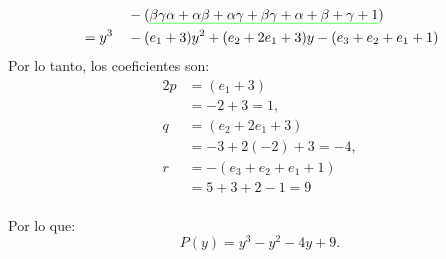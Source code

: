 \begin{solucion}
\begin{alignat*}{2}
    & &&-(\text{\setulcolor{green}\ul{$\beta\gamma\alpha + \alpha\beta + \alpha\gamma + \beta\gamma  + \alpha + \beta + \gamma + 1$}})\\
    &= y^3 && - (e_1 + 3)y^2 + (e_2 + 2e_1 + 3)y - (e_3 + e_2 + e_1 + 1)\\
  \end{alignat*}
  Por lo tanto, los coeficientes son:
  \begin{align*}{2}
    p &= (e_1 + 3)\\
    &= -2 + 3 = 1,\\
    q &= (e_2 + 2e_1 + 3) \\
    &= -3 + 2(-2) + 3 = -4,\\
    r &= -(e_3 + e_2 + e_1 + 1)\\
    &= 5 +3 + 2 - 1=9\\
  \end{align*}
  
  Por lo que:
  \[
  P(y)=y^3 - y^2 - 4y + 9.
  \]
  
\end{solucion}